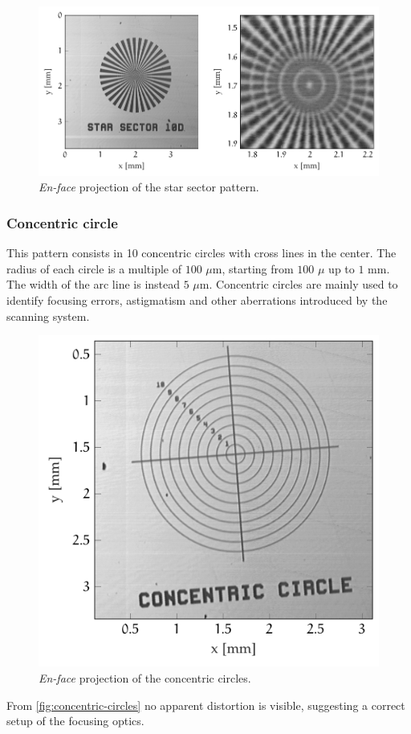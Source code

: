 \begin{figure}[hbt]
	\centering
	\includegraphics[width=1\linewidth]{gfx/ch4/axsun/target/star-sector}
	\caption{\emph{En-face} projection of the star sector pattern.}\label{fig:target-star}
\end{figure}

\subsubsection{Concentric circle}
This pattern consists in 10 concentric circles with cross lines in the center. The radius of each circle is a multiple of $100$ $\mu$m, starting from $100$ $\mu$ up to $1$ mm. The width of the arc line is instead $5$ $\mu$m. Concentric circles are mainly used to identify focusing errors, astigmatism and other aberrations introduced by the scanning system. 

\begin{figure}[hbt]
	\centering
	\includegraphics[width=0.5\linewidth]{gfx/ch4/axsun/target/concentric-circles}
	\caption{\emph{En-face} projection of the concentric circles.}\label{fig:concentric-circles}
\end{figure}

From \autoref{fig:concentric-circles} no apparent distortion is visible, suggesting a correct setup of the focusing optics. 



